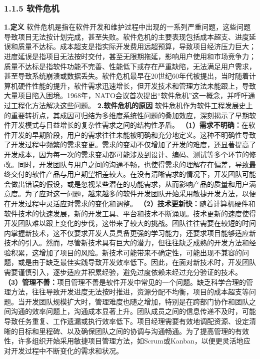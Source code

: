 \subsubsection{1.1.5 软件危机}\label{ux8f6fux4ef6ux5371ux673a} \textbf{1.定义}
软件危机是指在软件开发和维护过程中出现的一系列严重问题，这些问题导致项目无法按计划完成，甚至失败。软件危机的主要表现包括成本超支、进度延误和质量不达标。成本超支是指实际开发费用远超预算，导致项目经济压力巨大；进度延误是指项目无法按时交付，甚至无限期拖延，影响用户使用和市场竞争力；质量不达标是指软件功能不完善、性能低下或存在严重缺陷，无法满足用户需求，甚至导致系统崩溃或数据丢失。软件危机最早在20世纪60年代被提出，当时随着计算机硬件性能的提升，软件需求迅速增长，但开发技术和管理方法未能跟上，导致大量项目陷入困境。1968年，NATO会议首次提出``软件危机''这一概念，并呼吁通过工程化方法解决这些问题。
\textbf{2.软件危机的原因} 软件危机作为软件工程发展史上的重要转折点，其成因可归结为多维度系统性问题的叠加效应，深刻揭示了早期软件开发模式与日益增长的复杂性需求之间的结构性矛盾。
\textbf{（1）需求不明确：}在软件开发的早期阶段，用户的需求往往未能被明确和充分地定义。这种不明确性导致了开发过程中频繁的需求变更。需求的变动不仅增加了开发的难度，还显著提高了开发成本，因为每一次的需求变动都可能涉及到设计、编码、测试等多个环节的修改。同时，开发团队与用户之间的沟通不畅，也使得需求的理解存在偏差，导致最终交付的软件产品与用户期望相差较大。在没有清晰需求的情况下，开发团队可能会做出错误的假设，或是忽视某些潜在的功能需求，从而影响产品的质量和用户满意度。为了应对这一问题，越来越多的软件开发团队开始采用敏捷开发方法，以便在开发过程中灵活应对需求的变化和调整。
\textbf{（2）技术更新快：}随着计算机硬件和软件技术的快速发展，新的开发工具、平台和技术不断涌现。技术更新的速度使得开发团队难以跟上变化的步伐，这带来了较大的挑战。团队往往需要在较短的时间内掌握新技术，这不仅要求开发人员具备更强的学习能力，还要求项目能够适应新技术的引入。然而，尽管新技术具有巨大的潜力，但往往缺乏成熟的开发方法和经验积累，这增加了项目的风险。新技术可能带来不确定性，可能出现不兼容的问题，或是由于缺乏最佳实践导致开发效率低下。因此，在面对新技术时，开发团队需要谨慎引入，逐步适应并积累经验，避免过度依赖未经过充分验证的技术。
\textbf{（3）管理不善：}项目管理不善是软件开发中常见的一个问题。缺乏科学合理的管理方法，往往导致开发进度无法按时推进，资源分配不均衡，项目的成本超支等问题。当开发团队规模扩大时，管理难度也随之增加，特别是在跨部门协作和团队之间沟通的效率问题上，沟通成本显著上升。团队成员之间的信息传递不及时，可能导致任务重复、工作遗漏或执行效率低下。项目经理需要有效地调配资源、设定清晰的目标和里程碑、以及确保团队之间的协调与沟通畅通。为了提高管理的有效性，许多组织开始采用敏捷项目管理方法，如Scrum或Kanban，以便更灵活地应对开发过程中不断变化的需求和状况。
